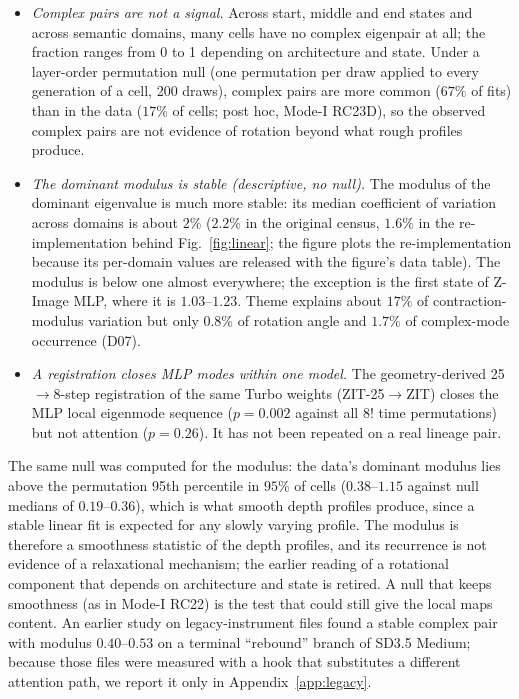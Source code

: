 \documentclass[11pt]{article}
\theoremstyle{definition}
\newcommand{\TT}{ZIT-25}%
\begin{document}
\begin{itemize}
 \item \emph{Complex pairs are not a signal.} Across start, middle and end states and across semantic domains, many cells have no complex eigenpair at all; the fraction ranges from 0 to 1 depending on architecture and state. Under a layer-order permutation null (one permutation per draw applied to every generation of a cell, 200 draws), complex pairs are more common ($67\%$ of fits) than in the data ($17\%$ of cells; post hoc, Mode-I RC23D), so the observed complex pairs are not evidence of rotation beyond what rough profiles produce.
 \item \emph{The dominant modulus is stable (descriptive, no null).} The modulus of the dominant eigenvalue is much more stable: its median coefficient of variation across domains is about $2\%$ ($2.2\%$ in the original census, $1.6\%$ in the re-implementation behind Fig.~\ref{fig:linear}; the figure plots the re-implementation because its per-domain values are released with the figure's data table). The modulus is below one almost everywhere; the exception is the first state of Z-Image MLP, where it is $1.03$--$1.23$. Theme explains about $17\%$ of contraction-modulus variation but only $0.8\%$ of rotation angle and $1.7\%$ of complex-mode occurrence (D07).
 \item \emph{A registration closes MLP modes within one model.} The geometry-derived 25$\to$8-step registration of the same Turbo weights (\TT{}$\to$ZIT) closes the MLP local eigenmode sequence ($p=0.002$ against all $8!$ time permutations) but not attention ($p=0.26$). It has not been repeated on a real lineage pair.
\end{itemize}
The same null was computed for the modulus: the data's dominant modulus lies above the permutation 95th percentile in $95\%$ of cells ($0.38$--$1.15$ against null medians of $0.19$--$0.36$), which is what smooth depth profiles produce, since a stable linear fit is expected for any slowly varying profile. The modulus is therefore a smoothness statistic of the depth profiles, and its recurrence is not evidence of a relaxational mechanism; the earlier reading of a rotational component that depends on architecture and state is retired. A null that keeps smoothness (as in Mode-I RC22) is the test that could still give the local maps content. An earlier study on legacy-instrument files found a stable complex pair with modulus $0.40$--$0.53$ on a terminal ``rebound'' branch of SD3.5 Medium; because those files were measured with a hook that substitutes a different attention path, we report it only in Appendix~\ref{app:legacy}.
\end{document}
